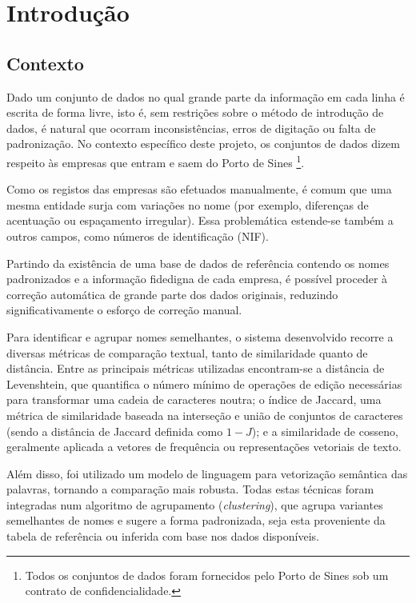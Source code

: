 \documentclass[a4paper,12pt]{article}
\begin{document}
\section{Introdução}
\subsection{Contexto}

Dado um conjunto de dados no qual grande parte da informação em cada linha é escrita de forma livre, isto é, sem restrições sobre o método de introdução de dados, é natural que ocorram inconsistências, erros de digitação ou falta de padronização. No contexto específico deste projeto, os conjuntos de dados dizem respeito às empresas que entram e saem do Porto de Sines \footnote{Todos os conjuntos de dados foram fornecidos pelo Porto de Sines sob um contrato de confidencialidade.}.

Como os registos das empresas são efetuados manualmente, é comum que uma mesma entidade surja com variações no nome (por exemplo, diferenças de acentuação ou espaçamento irregular). Essa problemática estende-se também a outros campos, como números de identificação (NIF).

Partindo da existência de uma base de dados de referência contendo os nomes padronizados e a informação fidedigna de cada empresa, é possível proceder à correção automática de grande parte dos dados originais, reduzindo significativamente o esforço de correção manual.

Para identificar e agrupar nomes semelhantes, o sistema desenvolvido recorre a diversas métricas de comparação textual, tanto de similaridade quanto de distância. Entre as principais métricas utilizadas encontram-se a distância de Levenshtein, que quantifica o número mínimo de operações de edição necessárias para transformar uma cadeia de caracteres noutra; o índice de Jaccard, uma métrica de similaridade baseada na interseção e união de conjuntos de caracteres (sendo a distância de Jaccard definida como \(1 - J\)); e a similaridade de cosseno, geralmente aplicada a vetores de frequência ou representações vetoriais de texto.

Além disso, foi utilizado um modelo de linguagem para vetorização semântica das palavras, tornando a comparação mais robusta. Todas estas técnicas foram integradas num algoritmo de agrupamento (\textit{clustering}), que agrupa variantes semelhantes de nomes e sugere a forma padronizada, seja esta proveniente da tabela de referência ou inferida com base nos dados disponíveis.
\end{document}
